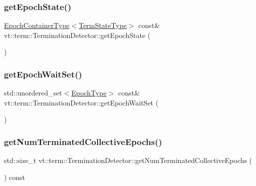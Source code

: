 \subsubsection{\texorpdfstring{get\+Epoch\+State()}{getEpochState()}}
{\footnotesize\ttfamily \hyperlink{structvt_1_1term_1_1_termination_detector_a69e2615b61e072977463eea5b20b7933}{Epoch\+Container\+Type}$<$\hyperlink{structvt_1_1term_1_1_term_action_ae4c635b69751d887666814700ed64d65}{Term\+State\+Type}$>$ const\& vt\+::term\+::\+Termination\+Detector\+::get\+Epoch\+State (\begin{DoxyParamCaption}{ }\end{DoxyParamCaption})\hspace{0.3cm}{\ttfamily [inline]}}

\mbox{\label{structvt_1_1term_1_1_termination_detector_aed77c0e79a681705e941314e7415df35}} 
\subsubsection{\texorpdfstring{get\+Epoch\+Wait\+Set()}{getEpochWaitSet()}}
{\footnotesize\ttfamily std\+::unordered\+\_\+set$<$\hyperlink{namespacevt_a81d11b28122d43bf9834577e4a06440f}{Epoch\+Type}$>$ const\& vt\+::term\+::\+Termination\+Detector\+::get\+Epoch\+Wait\+Set (\begin{DoxyParamCaption}{ }\end{DoxyParamCaption})\hspace{0.3cm}{\ttfamily [inline]}}

\mbox{\label{structvt_1_1term_1_1_termination_detector_af0b08c4a5dd17d893e677ad280bef84a}} 
\subsubsection{\texorpdfstring{get\+Num\+Terminated\+Collective\+Epochs()}{getNumTerminatedCollectiveEpochs()}}
{\footnotesize\ttfamily std\+::size\+\_\+t vt\+::term\+::\+Termination\+Detector\+::get\+Num\+Terminated\+Collective\+Epochs (\begin{DoxyParamCaption}{ }\end{DoxyParamCaption}) const}




